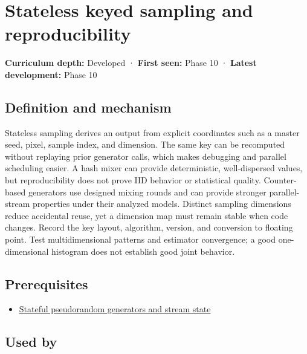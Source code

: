 \hypertarget{appendix-daaf25bfd3a0}{}\label{referencestart:appendix-daaf25bfd3a0}
\section{Stateless keyed sampling and reproducibility}\label{appendix-daaf25bfd3a0-stateless-keyed-sampling-and-reproducibility}

\textbf{Curriculum depth:} Developed · \textbf{First seen:} Phase 10 · \textbf{Latest development:} Phase 10

\subsection{Definition and mechanism}\label{appendix-daaf25bfd3a0-definition-and-mechanism}

Stateless sampling derives an output from explicit coordinates such as a master seed, pixel, sample index, and dimension. The same key can be recomputed without replaying prior generator calls, which makes debugging and parallel scheduling easier. A hash mixer can provide deterministic, well-dispersed values, but reproducibility does not prove IID behavior or statistical quality. Counter-based generators use designed mixing rounds and can provide stronger parallel-stream properties under their analyzed models. Distinct sampling dimensions reduce accidental reuse, yet a dimension map must remain stable when code changes. Record the key layout, algorithm, version, and conversion to floating point. Test multidimensional patterns and estimator convergence; a good one-dimensional histogram does not establish good joint behavior.

\subsection{Prerequisites}\label{appendix-daaf25bfd3a0-prerequisites}

\begin{itemize}
\tightlist
\item
  \hyperref[appendix-e0f7c7e08f3a]{Stateful pseudorandom generators and stream state}
\end{itemize}

\subsection{Used by}\label{appendix-daaf25bfd3a0-used-by}

